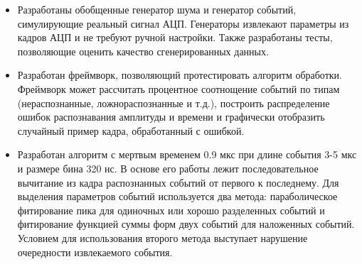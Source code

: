 \documentclass[a4paper,14pt]{extreport}
\begin{document}
\begin{enumerate}
    \begin{itemize}
       \item Разработаны обобщенные генератор шума и генератор событий, симулирующие реальный сигнал АЦП. Генераторы извлекают параметры из кадров АЦП и не требуют ручной настройки. Также разработаны тесты, позволяющие оценить качество сгенерированных данных. 
       \item Разработан фреймворк, позволяющий протестировать алгоритм обработки. Фреймворк может рассчитать процентное соотнощение событий по типам (нераспознанные, ложнораспознанные и т.д.), построить распределение ошибок распознавания амплитуды и времени и графически отобразить случайный пример кадра, обработанный с ошибкой.
       \item Разработан алгоритм с мертвым временем 0.9 мкс при длине события 3-5 мкс и размере бина 320 нс. В основе его работы лежит последовательное вычитание из кадра распознанных событий от первого к последнему. Для выделения параметров событий используется два метода: параболическое фитирование пика для одиночных или хорошо разделенных событий и фитирование функцией суммы форм двух событий для наложенных событий. Условием для использования второго метода выступает нарушение очередности извлекаемого события.
    \end{itemize}
\end{enumerate}

\printbibliography
\end{document}
